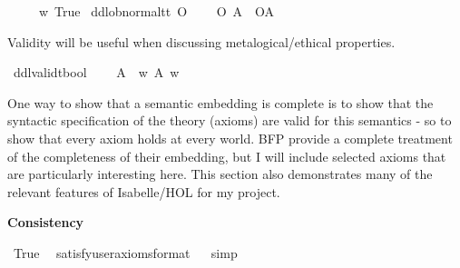 \begin{isabellebody}
\ \ \ {\isachardoublequoteopen}\isactrlbold {\isasymtop}\ {\isasymequiv}\ {\isasymlambda}w{\isachardot}\ True{\isachardoublequoteclose}\isanewline
{}\isamarkupfalse%
\ ddlob{\isacharunderscore}normal{\isacharcolon}{\isacharcolon}{\isachardoublequoteopen}t{\isasymRightarrow}t{\isachardoublequoteclose}\ {\isacharparenleft}{\isachardoublequoteopen}O\ {\isacharbraceleft}{\isacharunderscore}{\isacharbraceright}{\isachardoublequoteclose}{\isacharparenright}\isanewline
\ \ \ {\isachardoublequoteopen}{\isacharparenleft}O\ {\isacharbraceleft}A{\isacharbraceright}{\isacharparenright}\ {\isasymequiv}\ {\isacharparenleft}O{\isacharbraceleft}A{\isacharbar}\isactrlbold {\isasymtop}{\isacharbraceright}{\isacharparenright}\ {\isachardoublequoteclose}\isanewline
%
%
\begin{isamarkuptext}%
Validity will be useful when discussing metalogical/ethical properties.%
\end{isamarkuptext}\isamarkuptrue%
\isamarkupfalse%
\ ddlvalid{\isacharcolon}{\isacharcolon}{\isachardoublequoteopen}t{\isasymRightarrow}bool{\isachardoublequoteclose}\ {\isacharparenleft}{\isachardoublequoteopen}{\isasymTurnstile}{\isacharunderscore}{\isachardoublequoteclose}{\isacharparenright}\isanewline
\ \ \ {\isachardoublequoteopen}{\isasymTurnstile}A\ {\isasymequiv}\ {\isasymforall}w{\isachardot}\ A\ w{\isachardoublequoteclose}\isanewline
%
\isadelimdocument
%
\endisadelimdocument
%
\isatagdocument
%
\isamarkuptrue%
%
\endisatagdocument
{\isafolddocument}%
%
\isadelimdocument
%
\endisadelimdocument
%
\begin{isamarkuptext}%
One way to show that a semantic embedding is complete is to show that the syntactic specification
of the theory (axioms) are valid for this semantics - so to show that every axiom holds at every 
world. BFP \cite{BFP} provide a complete treatment of the completeness of their embedding, but I 
will include selected axioms that are particularly interesting here. This section also demonstrates many
of the relevant features of Isabelle/HOL for my project.%
\end{isamarkuptext}\isamarkuptrue%
%
\begin{isamarkuptext}%
\textbf{Consistency}%
\end{isamarkuptext}\isamarkuptrue%
\isamarkupfalse%
\ True\ \isamarkupfalse%
\ {\isacharbrackleft}satisfy{\isacharcomma}user{\isacharunderscore}axioms{\isacharcomma}format{\isacharequal}{}{\isacharbrackright}%
\isadelimproof
\ %
\endisadelimproof
%
\isatagproof
{}\isamarkupfalse%
\ simp\isanewline
%
\isanewline
%
\end{isabellebody}
